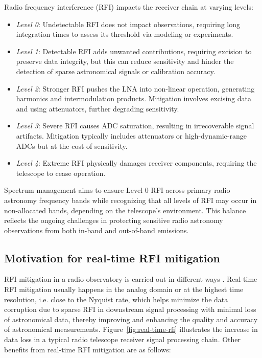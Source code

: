 Radio frequency interference (RFI) impacts the receiver chain at varying levels:
\begin{itemize}
\item \emph{Level 0}: Undetectable RFI does not impact observations, requiring long integration times to assess its threshold via modeling or experiments.
\item \emph{Level 1}: Detectable RFI adds unwanted contributions, requiring excision to preserve data integrity, but this can reduce sensitivity and hinder the detection of sparse astronomical signals or calibration accuracy.
\item \emph{Level 2}: Stronger RFI pushes the LNA into non-linear operation, generating harmonics and intermodulation products. Mitigation involves excising data and using attenuators, further degrading sensitivity.
\item \emph{Level 3}: Severe RFI causes ADC saturation, resulting in irrecoverable signal artifacts. Mitigation typically includes attenuators or high-dynamic-range ADCs but at the cost of sensitivity.
\item \emph{Level 4}: Extreme RFI physically damages receiver components, requiring the telescope to cease operation.
\end{itemize}
Spectrum management aims to ensure Level 0 RFI across primary radio astronomy frequency bands while recognizing that all levels of RFI may occur in non-allocated bands, depending on the telescope's environment. This balance reflects the ongoing challenges in protecting sensitive radio astronomy observations from both in-band and out-of-band emissions.


\subsection{Motivation for real-time RFI mitigation}
\label{subsection:hardware:introduction: motivations}

RFI mitigation in a radio observatory is carried out in different ways \citep{ford2014rfi}. Real-time RFI mitigation usually happens in the analog domain or at the highest time resolution, i.e. close to the Nyquist rate, which helps minimize the data corruption due to sparse RFI in downstream signal processing with minimal loss of astronomical data, thereby improving and enhancing the quality and accuracy of astronomical measurements. Figure~\ref{fig:real-time-rfi} illustrates the increase in data loss in a typical radio telescope receiver signal processing chain.
Other benefits from real-time RFI mitigation are as follows:


